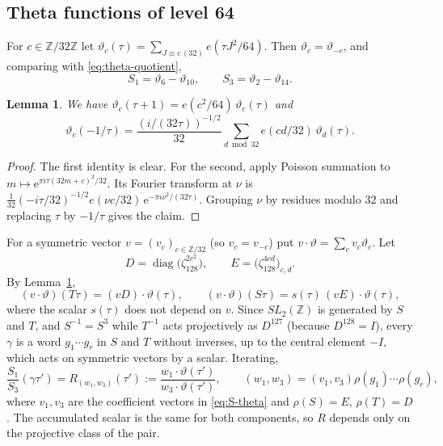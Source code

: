 \documentclass[11pt]{amsart}
\newtheorem{lemma}[theorem]{Lemma}
\theoremstyle{remark}
\theoremstyle{definition}
\newcommand{\Z}{\mathbb Z}
\newcommand{\e}{\mathrm e}
\begin{document}
\subsection{Theta functions of level 64}
For $c\in\Z/32\Z$ let $\vartheta_c(\tau)=\sum_{J\equiv c\,(32)}e(\tau J^2/64)$. Then $\vartheta_c=\vartheta_{-c}$, and comparing with \eqref{eq:theta-quotient},
\begin{equation}\label{eq:S-theta}
S_1=\vartheta_6-\vartheta_{10},\qquad S_3=\vartheta_2-\vartheta_{14}.
\end{equation}

\begin{lemma}\label{lem:weil}
We have $\vartheta_c(\tau+1)=e(c^2/64)\,\vartheta_c(\tau)$ and
\[
\vartheta_c(-1/\tau)=\frac{(i/(32\tau))^{-1/2}}{32}\sum_{d\bmod 32}e(cd/32)\,\vartheta_d(\tau).
\]
\end{lemma}

\begin{proof}
The first identity is clear. For the second, apply Poisson summation to $m\mapsto\e^{\pi i\tau(32m+c)^2/32}$. Its Fourier transform at $\nu$ is $\frac1{32}(-i\tau/32)^{-1/2}e(\nu c/32)\,\e^{-\pi i\nu^2/(32\tau)}$. Grouping $\nu$ by residues modulo $32$ and replacing $\tau$ by $-1/\tau$ gives the claim.
\end{proof}

For a symmetric vector $v=(v_c)_{c\in\Z/32}$ (so $v_c=v_{-c}$) put $v\cdot\vartheta=\sum_cv_c\vartheta_c$. Let
\[
D=\operatorname{diag}\big(\zeta_{128}^{2c^2}\big),\qquad E=\big(\zeta_{128}^{4cd}\big)_{c,d}.
\]
By Lemma~\ref{lem:weil},
\[
(v\cdot\vartheta)(T\tau)=(vD)\cdot\vartheta(\tau),\qquad (v\cdot\vartheta)(S\tau)=s(\tau)\,(vE)\cdot\vartheta(\tau),
\]
where the scalar $s(\tau)$ does not depend on $v$. Since $SL_2(\Z)$ is generated by $S$ and $T$, and $S^{-1}=S^3$ while $T^{-1}$ acts projectively as $D^{127}$ (because $D^{128}=I$), every $\gamma$ is a word $g_1\cdots g_r$ in $S$ and $T$ without inverses, up to the central element $-I$, which acts on symmetric vectors by a scalar. Iterating,
\begin{equation}\label{eq:R}
\frac{S_1}{S_3}(\gamma\tau')=R_{(w_1,w_3)}(\tau'):=\frac{w_1\cdot\vartheta(\tau')}{w_3\cdot\vartheta(\tau')},\qquad (w_1,w_3)=(v_1,v_3)\rho(g_1)\cdots\rho(g_r),
\end{equation}
where $v_1,v_3$ are the coefficient vectors in \eqref{eq:S-theta} and $\rho(S)=E$, $\rho(T)=D$. The accumulated scalar is the same for both components, so $R$ depends only on the projective class of the pair.
\end{document}
